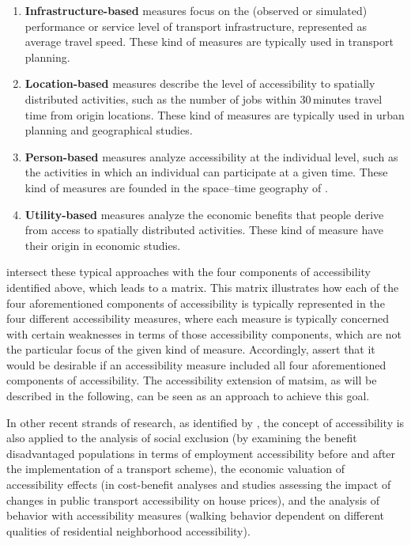 \begin{enumerate}
	\item \textbf{Infrastructure-based} measures focus on the (observed or simulated) performance or service level 
	of transport infrastructure, \eg represented as average travel speed. These kind of measures are typically used 
	in transport planning.
	
	\item \textbf{Location-based} measures describe the level of accessibility to spatially distributed activities, such as 
	the number of jobs within 30\,minutes travel time from origin locations. These kind of measures are typically used 
	in urban planning and geographical studies.
	
	
	\item \textbf{Person-based} measures analyze accessibility at the individual level, such as the activities in which an 
	individual can participate at a given time. These kind of measures are founded in the space–time geography 
	of \citet{Haegerstrand1970}.
	
	\item \textbf{Utility-based} measures analyze the economic benefits that people derive from access to spatially 
	distributed activities. These kind of measure have their origin in economic studies.
\end{enumerate}

\citet{Geurs2004AccessibilityReview} intersect these typical approaches with the four components of accessibility identified 
above, which leads to a matrix. This matrix illustrates how each of the four aforementioned components of accessibility is 
typically represented in the four different accessibility measures, where each measure is typically concerned with certain weaknesses 
in terms of those accessibility components, which are not the particular focus of the given kind of measure. Accordingly, \citet{Geurs2004AccessibilityReview} assert that it would be desirable if an accessibility measure included 
all four aforementioned components of accessibility. The accessibility extension of \gls{matsim}, as will be described in 
the following, can be seen as an approach to achieve this goal.

In other recent strands of research, as identified by \citet{GeursEtAl2012AccessibilityTransportIntroduction}, the concept of 
accessibility is also applied to the analysis of social exclusion (\eg by examining the benefit 
disadvantaged populations in terms of employment accessibility before and after the implementation of a transport scheme), 
the economic valuation of accessibility effects (\eg in cost-benefit analyses and studies assessing the impact of changes in 
public transport accessibility on house prices), and the analysis of behavior with accessibility measures (\eg walking behavior 
dependent on different qualities of residential neighborhood accessibility).

